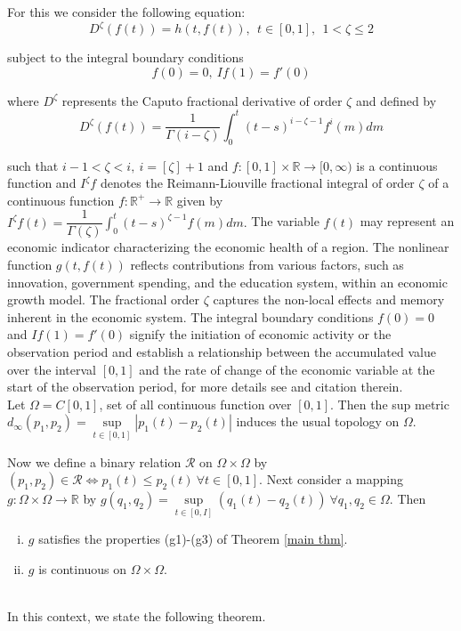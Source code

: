 \documentclass[10pt, reqno]{amsart}
\theoremstyle{definition}
\theoremstyle{remark}
\numberwithin{equation}{section}
\begin{document}
  
  For this we consider the following equation:
%
\begin{equation}\label{ode}
		D^\zeta ( f ( t ) ) = h ( t, f ( t ) ), ~~  t \in [ 0, 1 ], ~~ 1 <  \zeta \leq 2
\end{equation}

subject to  the  integral boundary conditions
 \begin{equation}\label{app2}
 	f ( 0 ) = 0, ~ I f ( 1 ) = f' ( 0 ) 
 \end{equation} 
 
 where $ D^\zeta $ represents the Caputo fractional derivative of order $ \zeta $ and defined by
 \begin{equation}\label{app3}
 	D^\zeta ( f ( t ) ) = \dfrac{1}{\Gamma ( i - \zeta )} \int_{0}^{t} ( t- s)^{i-\zeta - 1} f^i ( m ) dm 
 \end{equation} 
 
 such that $ i -1 < \zeta < i, ~ i = [\zeta] + 1$ and $ f : [0, 1 ] \times \mathbb{R} \to [0, \infty ) $ is a continuous function and $ I^\zeta f $ denotes the Reimann-Liouville fractional  integral of order $ \zeta $  of a continuous function $ f : \mathbb{R}^+ \to \mathbb{R} $ given by
 $ I^\zeta f ( t ) = \dfrac{1}{\Gamma ( \zeta )} \int_{0}^{t} ( t- s)^{ \zeta - 1} f  ( m ) dm. $  
The variable $ f(t) $ may represent an economic indicator characterizing the economic health of a region. The nonlinear function $ g(t,f(t) ) $ reflects contributions from various factors, such as innovation, government spending, and the education system, within an economic growth model. The fractional order $ \zeta $ captures the non-local effects and memory inherent in the economic system. The integral boundary conditions $ f(0) = 0 $  and $ I f(1 ) = f'  ( 0 ) $ signify the initiation of economic activity or the observation period and establish a relationship between the accumulated value over the interval $ [0,1] $ and the rate of change of the economic variable at the start of the observation period, for more details see \cite{15,16,17} and citation therein. \\



 
%
Let $ \Omega = C [ 0, 1 ] $, set of all continuous function over $ [ 0, 1 ] $. Then the sup metric $ d_\infty ( p_1, p_2 ) = \underset{t \in [ 0, 1 ]}{\sup} | p_1 ( t ) -  p_2 (t ) | $ induces the usual topology on $ \Omega $.

Now we define a binary relation $ \mathcal{R} $ on $ \Omega \times \Omega $ by $ ( p_1, p_2 ) \in \mathcal{R} \iff p_1 ( t ) \leq p_2 ( t ) ~ \forall t \in [ 0, 1 ] $.
%
Next consider a mapping $   g : \Omega \times \Omega \to \mathbb{R} $ by  $ g( q_1, q_2 ) = \underset{t \in [ 0, I ]}{\sup}  (   q_1 ( t ) - q_2 ( t ) ) ~  \forall q_1, q_2 \in \Omega $.  
Then  
\begin{enumerate}[(i)]
	\item $ g $ satisfies the properties (g1)-(g3) of Theorem \ref{main thm}.  
	\item   $  g $  is continuous on $ \Omega \times \Omega $.
\end{enumerate}
~\\
%  
In this context, we state the following theorem. 
\end{document}
